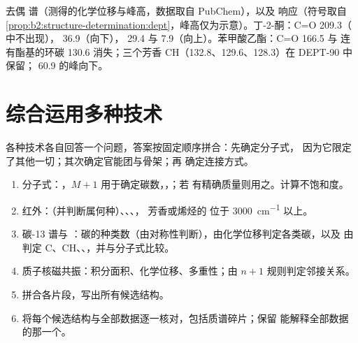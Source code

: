 \begin{omfigure}
{\small 去偶  谱（测得的化学位移与峰高，数据取自 PubChem），以及 
响应（符号取自\cref{prop:b2:structure-determination:dept}，峰高仅为示意）。丁-2-酮：C=O
209.3（ 中不出现）， 36.9（向下）， 29.4 与 7.9（向上）。苯甲酸乙酯：C=O 166.5 与
连有酯基的环碳 130.6 消失；三个芳香 CH（132.8、129.6、128.3）在
DEPT-90 中保留； 60.9 的峰向下。}
\end{omfigure}

\section{综合运用多种技术}

各种技术各自回答一个问题，答案按固定顺序拼合：先确定分子式，
因为它限定了其他一切；其次确定官能团与骨架；再
确定连接方式。

\begin{method}[求解未知物]\label{met:b2:structure-determination:solve}
\begin{enumerate}
  \item 分子式：，$M+1$ 用于确定碳数，，；若
        有精确质量则用之。计算不饱和度。
  \item 红外：（并判断属何种）、、、，
        芳香或烯烃的  位于 \qty{3000}{cm^{-1}} 以上。
  \item 碳-13 谱与 ：碳的种类数（由对称性判断），由化学位移判定各类碳，以及
        由  判定 C、CH、、，并与分子式比较。
  \item 质子核磁共振：积分面积、化学位移、多重性；由 $n + 1$ 规则判定邻接关系。
  \item 拼合各片段，写出所有候选结构。
  \item 将每个候选结构与全部数据逐一核对，包括质谱碎片；保留
        能解释全部数据的那一个。
\end{enumerate}
\end{method}

